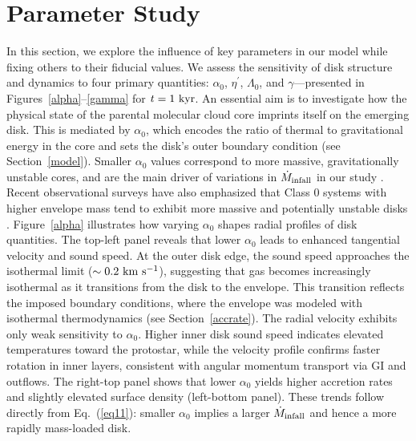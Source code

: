 \documentclass[twocolumn,linenumbers]{aastex631}
\begin{document}
\section{Parameter Study}\label{paramstudy}

In this section, we explore the influence of key parameters in our model while fixing others to their fiducial values. We assess the sensitivity of disk structure and dynamics to four primary quantities: $\alpha_{0}$, $\eta^{\prime}$, $\Lambda_{0}$, and $\gamma$—presented in Figures~\ref{alpha}–\ref{gamma} for $t = 1~{\rm kyr}$. An essential aim is to investigate how the physical state of the parental molecular cloud core imprints itself on the emerging disk. This is mediated by $\alpha_{0}$, which encodes the ratio of thermal to gravitational energy in the core and sets the disk’s outer boundary condition (see Section~\ref{model}). Smaller $\alpha_{0}$ values correspond to more massive, gravitationally unstable cores, and are the main driver of variations in $\dot{M}_{\rm infall}$ in our study \citep{machida2011recurrent}. Recent observational surveys have also emphasized that Class 0 systems with higher envelope mass tend to exhibit more massive and potentially unstable disks \citep{tobin2020vandam, maury2019characterizing}. 
Figure~\ref{alpha} illustrates how varying $\alpha_{0}$ shapes radial profiles of disk quantities. The top-left panel reveals that lower $\alpha_{0}$ leads to enhanced tangential velocity and sound speed. At the outer disk edge, the sound speed approaches the isothermal limit ($\sim 0.2~{\rm km~s^{-1}}$), suggesting that gas becomes increasingly isothermal as it transitions from the disk to the envelope. This transition reflects the imposed boundary conditions, where the envelope was modeled with isothermal thermodynamics (see Section~\ref{accrate}). The radial velocity exhibits only weak sensitivity to $\alpha_{0}$. Higher inner disk sound speed indicates elevated temperatures toward the protostar, while the velocity profile confirms faster rotation in inner layers, consistent with angular momentum transport via GI and outflows. The right-top panel shows that lower $\alpha_{0}$ yields higher accretion rates and slightly elevated surface density (left-bottom panel). These trends follow directly from Eq.~(\ref{eq11}): smaller $\alpha_0$ implies a larger $\dot{M}_{\rm infall}$ and hence a more rapidly mass-loaded disk.
\end{document}
